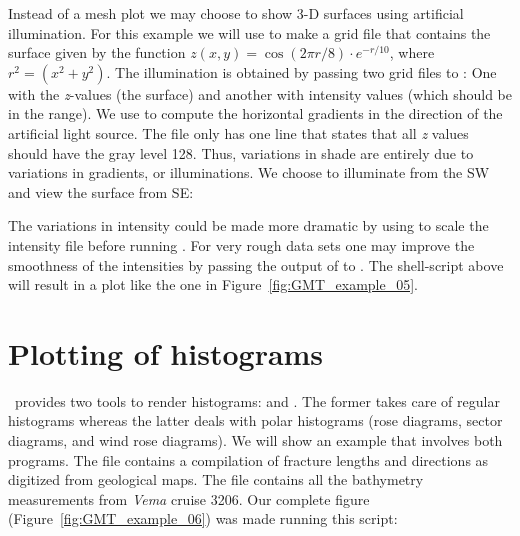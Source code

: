Instead of a mesh plot we may choose to show 3-D surfaces using
artificial illumination.  For this example we will use
 to make a grid file that contains the surface given
by the function $z(x, y) = \cos (2\pi r/8)\cdot e^{-r/10}$, where
$r^2 = (x^2 + y^2)$.  The illumination is obtained by passing
two grid files to : One with the {\it z}-values
(the surface) and another with intensity values (which should
be in the  range).  We use  to compute
the horizontal gradients in the direction of the artificial
light source.  The  file only has one line that states
that all {\it z} values should have the gray level 128.  Thus,
variations in shade are entirely due to variations in gradients,
or illuminations.  We choose to illuminate from the SW and view
the surface from SE:


The variations in intensity could be made more dramatic by
using  to scale the intensity file before
running .  For very rough data sets one may
improve the smoothness of the intensities by passing the
output of  to .  The
shell-script above will result in a plot like the one in
Figure~\ref{fig:GMT_example_05}.



\section{Plotting of histograms}

\GMT\ provides two tools to render histograms: 
and .  The former takes care of regular histograms
whereas the latter deals with polar histograms (rose diagrams,
sector diagrams, and wind rose diagrams).  We will show an
example that involves both programs.  The file 
contains a compilation of fracture lengths and directions as
digitized from geological maps.  The file  contains
all the bathymetry measurements from {\it Vema} cruise 3206.
Our complete figure (Figure~\ref{fig:GMT_example_06}) was made running
this script:




